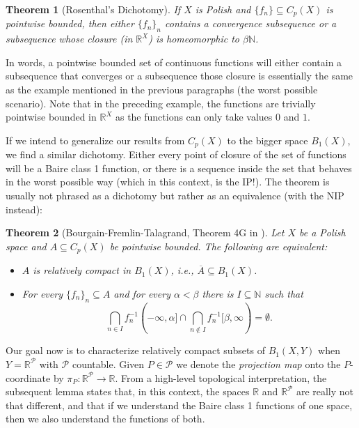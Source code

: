 \documentclass[psamsfonts]{amsart}
\newtheorem{thm}{Theorem}[section]
\theoremstyle{definition}
\theoremstyle{remark}
\numberwithin{equation}{section}
\begin{document}
\begin{thm}[Rosenthal's Dichotomy]
    If $X$ is Polish and $\{f_n\}\subseteq C_p(X)$ is pointwise bounded, then either $\{f_n\}_n$ contains a convergence subsequence or a subsequence whose closure (in $\mathbb R^X$) is homeomorphic to $\beta\mathbb N$.
\end{thm}

In words, a pointwise bounded set of continuous functions will either contain a subsequence that converges or a subsequence those closure is essentially the same as the example mentioned in the previous paragraphs (the worst possible scenario). Note that in the preceding example, the functions are trivially pointwise bounded in $\mathbb R^X$ as the functions can only take values $0$ and $1$.

If we intend to generalize our results from $C_p(X)$ to the bigger space $B_1(X)$, we find a similar dichotomy. Either every point of closure of the set of functions will be a Baire class 1 function, or there is a sequence inside the set that behaves in the worst possible way (which in this context, is the IP!). The theorem is usually not phrased as a dichotomy but rather as an equivalence (with the NIP instead):

\begin{thm}[Bourgain-Fremlin-Talagrand, Theorem 4G in \cite{BFT_1978_PCompactBaire}]\label{BFT}
    Let $X$ be a Polish space and $A\subseteq C_p(X)$ be pointwise bounded. The following are equivalent:
    \begin{itemize}
        \item [(i)] $A$ is relatively compact in $B_1(X)$, i.e., $\overline{A}\subseteq B_1(X)$.
        \item [(ii)] For every $\{f_n\}_n\subseteq A$ and for every $\alpha<\beta$ there is $I\subseteq\mathbb{N}$ such that
$$\bigcap_{n\in I}f_n^{-1}(-\infty,\alpha]\cap\bigcap_{n\notin I}f_n^{-1}[\beta,\infty)=\emptyset.$$
    \end{itemize}
\end{thm}

Our goal now is to characterize relatively compact subsets of $B_1(X,Y)$ when $Y=\mathbb{R}^\mathcal{P}$ with $\mathcal{P}$ countable. Given $P\in\mathcal{P}$ we denote the \emph{projection map} onto the $P$-coordinate by $\pi_P:\mathbb{R}^\mathcal{P}\rightarrow\mathbb{R}$. From a high-level topological interpretation, the subsequent lemma states that, in this context, the spaces $\mathbb R$ and $\mathbb R^\mathcal P$ are really not that different, and that if we understand the Baire class 1 functions of one space, then we also understand the functions of both.
\end{document}
